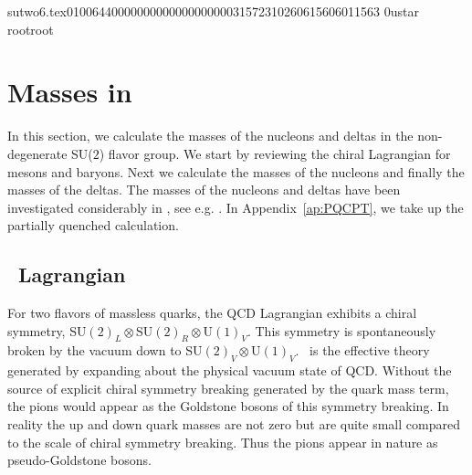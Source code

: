                                                                                                                                                                                                                                                                                       sutwo6.tex                                                                                          0100644 0000000 0000000 00000315723 10260615606 011563  0                                                                                                    ustar   root                            root                                                                                                                                                                                                                   \documentclass[prd,amssymb,amsmath,showpacs,nofootinbib,superscriptaddress]{revtex4}
\begin{document}
\section{Masses in \CPT} \label{CPT}


In this section, we calculate the masses of the nucleons and deltas 
in the non-degenerate SU($2$) flavor group. We start by reviewing the
chiral Lagrangian for mesons and baryons. Next we calculate the masses of the nucleons
and finally the masses of the deltas. The masses of the nucleons and 
deltas have been investigated considerably in 
\CPT, see e.g. \cite{Gasser:1980sb,Jenkins:1992ts,Bernard:1993nj,Lebed:1994yu,Lebed:1994gt,Banerjee:1995bk, 
  Borasoy:1997bx, Becher:1999he, Frink:2004ic, Walker-Loud:2004hf,
  Tiburzi:2004rh, Lehnhart:2004vi}.
In Appendix~\ref{ap:PQCPT}, we take up the partially quenched calculation.




%
%
%
%
%
%
%
%
%
%
%
%

\subsection{\CPT\ Lagrangian}


For two flavors of massless quarks, the QCD Lagrangian exhibits a
chiral symmetry, SU$(2)_L \otimes$SU$(2)_R \otimes$U$(1)_V$. 
This symmetry is spontaneously broken by the vacuum down to SU$(2)_V \otimes$U$(1)_V$.
\CPT\ is the effective theory generated by expanding about the physical vacuum state
of QCD. Without the source of explicit chiral symmetry breaking generated by 
the quark mass term, the pions would appear as the Goldstone bosons of
this symmetry breaking.  In reality the up and down quark masses are not zero
but are quite small compared to the scale of chiral symmetry breaking. Thus the 
pions appear in nature as pseudo-Goldstone bosons. 
\end{document}
